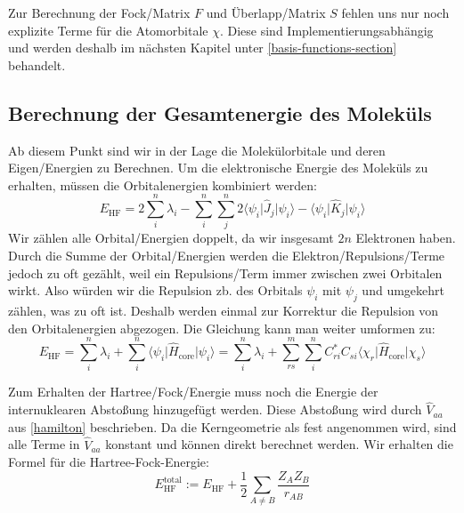 Zur Berechnung der Fock\-/Matrix $F$ und Überlapp\-/Matrix $S$
fehlen uns nur noch explizite Terme für die Atomorbitale $\chi$.
Diese sind Implementierungsabhängig und werden deshalb im nächsten Kapitel
unter \cref{basis-functions-section} behandelt.

\subsection{Berechnung der Gesamtenergie des Moleküls}
Ab diesem Punkt sind wir in der Lage die Molekülorbitale und
deren Eigen\-/Energien zu Berechnen. Um die elektronische Energie des Moleküls zu erhalten,
müssen die Orbitalenergien kombiniert werden:
\begin{equation}
    E_{\text{HF}} = 2 \sum_i^n \lambda_i - \sum_i^n \sum_j^n
    2 \langle \psi_i \vert \hat{J}_j \vert \psi_i \rangle
    - \langle \psi_i \vert \hat{K}_j \vert \psi_i \rangle
\end{equation}
Wir zählen alle Orbital\-/Energien doppelt, da wir insgesamt $2n$ Elektronen haben.
Durch die Summe der Orbital\-/Energien werden die Elektron\-/Repulsions\-/Terme
jedoch zu oft gezählt, weil ein Repulsions\-/Term immer zwischen zwei Orbitalen wirkt.
Also würden wir die Repulsion zb. des Orbitals $\psi_i$ mit $\psi_j$ und umgekehrt zählen,
was zu oft ist.
Deshalb werden einmal zur Korrektur die Repulsion von den Orbitalenergien abgezogen.
Die Gleichung kann man weiter umformen zu:
\begin{equation}
    E_{\text{HF}} = \sum_i^n \lambda_i
    + \sum_i^n \langle \psi_i \vert \hat{H}_{\text{core}} \vert \psi_i \rangle
    = \sum_i^n \lambda_i
    + \sum_{rs}^m \sum_i^{n} C_{ri}^*C_{si}
    \langle \chi_r \vert \hat{H}_{\text{core}} \vert \chi_s \rangle
\end{equation}

Zum Erhalten der Hartree\-/Fock\-/Energie muss noch die Energie
der internuklearen Abstoßung hinzugefügt werden.
Diese Abstoßung wird durch $\hat{V}_{aa}$ aus \cref*{hamilton} beschrieben.
Da die Kerngeometrie als fest angenommen wird, sind alle Terme in $\hat{V}_{aa}$ konstant
und können direkt berechnet werden. Wir erhalten die Formel für die Hartree-Fock-Energie:
\begin{equation}
    E_{\text{HF}}^{\text{total}} := E_{\text{HF}} + \frac{1}{2}\sum_{A \neq B } \frac{Z_A Z_B}{r_{AB}}
\end{equation}

\cite[S. 229-231]{lewars_2016}



